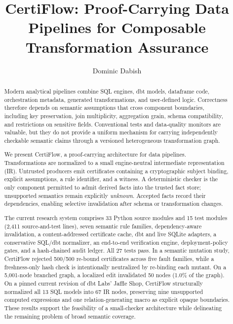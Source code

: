 \documentclass[sigconf,nonacm]{acmart}
\begin{document}
\title{CertiFlow: Proof-Carrying Data Pipelines for Composable Transformation Assurance}

\author{Dominic Dabish}

\begin{abstract}
Modern analytical pipelines combine SQL engines, dbt models, dataframe code, orchestration metadata, generated transformations, and user-defined logic. Correctness therefore depends on semantic assumptions that cross component boundaries, including key preservation, join multiplicity, aggregation grain, schema compatibility, and restrictions on sensitive fields. Conventional tests and data-quality monitors are valuable, but they do not provide a uniform mechanism for carrying independently checkable semantic claims through a versioned heterogeneous transformation graph.

We present CertiFlow, a proof-carrying architecture for data pipelines. Transformations are normalized to a small engine-neutral intermediate representation (IR). Untrusted producers emit certificates containing a cryptographic subject binding, explicit assumptions, a rule identifier, and a witness. A deterministic checker is the only component permitted to admit derived facts into the trusted fact store; unsupported semantics remain explicitly \emph{unknown}. Accepted facts record their dependencies, enabling selective invalidation after schema or transformation changes.

The current research system comprises 33 Python source modules and 15 test modules (2,411 source-and-test lines), seven semantic rule families, dependency-aware invalidation, a content-addressed certificate cache, dbt and live SQLite adapters, a conservative SQL/dbt normalizer, an end-to-end verification engine, deployment-policy gates, and a hash-chained audit ledger. All 27 tests pass. In a semantic mutation study, CertiFlow rejected 500/500 re-bound certificates across five fault families, while a freshness-only hash check is intentionally neutralized by re-binding each mutant. On a 5,001-node branched graph, a localized edit invalidated 50 nodes (1.0\% of the graph). On a pinned current revision of dbt Labs' Jaffle Shop, CertiFlow structurally normalized all 13 SQL models into 67 IR nodes, preserving nine unsupported computed expressions and one relation-generating macro as explicit opaque boundaries. These results support the feasibility of a small-checker architecture while delineating the remaining problem of broad semantic coverage.
\end{abstract}
\end{document}
